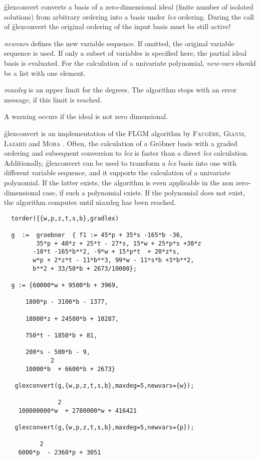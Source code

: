 \f{glexconvert} converts a basis of a zero-dimensional ideal (finite number
of isolated solutions) from arbitrary ordering into a basis under \textit{lex}
ordering. During the call of \f{glexconvert} the original ordering of
the input basis must be still active!

\emph{newvars} defines the new variable sequence. If omitted, the
original variable sequence is used. If only a subset of variables is
specified here, the partial ideal basis is evaluated. For the
calculation of a univariate polynomial, \emph{new-vars} should be a list
with one element.

\emph{maxdeg} is an upper limit for the degrees. The algorithm stops with
an error message, if this limit is reached.

A warning occurs if the ideal is not zero dimensional.

\f{glexconvert} is an implementation of the FLGM algorithm by
\linebreak[4] \textsc{Faug{\`e}re}, \textsc{Gianni}, \textsc{Lazard} and
\textsc{Mora} \cite{Faugere:93}. Often, the calculation of a Gr\"obner basis
with a graded ordering and subsequent conversion to \textit{lex} is
faster than a direct \textit{lex} calculation. Additionally, \f{glexconvert}
can be used to transform a \textit{lex} basis into one with different
variable sequence, and it supports the calculation of a univariate
polynomial. If the latter exists, the algorithm is even applicable in
the non zero-dimensional case, if such a polynomial exists.
If the polynomial does not exist, the algorithm computes  until \f{maxdeg}
has been reached.
\begin{verbatim}
  torder({{w,p,z,t,s,b},gradlex)

  g  :=  groebner  { f1 := 45*p + 35*s -165*b -36,
         35*p + 40*z + 25*t - 27*s, 15*w + 25*p*s +30*z
        -18*t -165*b**2, -9*w + 15*p*t  + 20*z*s,
        w*p + 2*z*t - 11*b**3, 99*w - 11*s*b +3*b**2,
        b**2 + 33/50*b + 2673/10000};

  g := {60000*w + 9500*b + 3969,

      1800*p - 3100*b - 1377,

      18000*z + 24500*b + 10287,

      750*t - 1850*b + 81,

      200*s - 500*b - 9,
             2
      10000*b  + 6600*b + 2673}

   glexconvert(g,{w,p,z,t,s,b},maxdeg=5,newvars={w});

               2
    100000000*w  + 2780000*w + 416421

   glexconvert(g,{w,p,z,t,s,b},maxdeg=5,newvars={p});

          2
    6000*p  - 2360*p + 3051
\end{verbatim}

